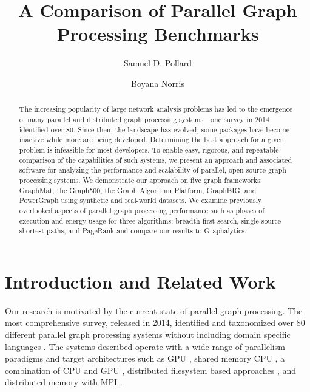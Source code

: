 \documentclass{llncs}
\begin{document}
\title{A Comparison of Parallel Graph Processing Benchmarks}
\author{Samuel D. Pollard \and Boyana Norris}
\maketitle
\begin{abstract}
The increasing popularity of large network analysis problems has led to the emergence of many parallel and distributed graph processing systems---one survey in 2014 identified over 80. Since then, the landscape has evolved; some packages have become inactive while more are being developed. Determining the best approach for a given problem is infeasible for most developers. To enable easy, rigorous, and repeatable comparison of the capabilities of such systems, we present an approach and associated software for analyzing the performance and scalability of parallel, open-source graph processing systems. We demonstrate our approach on five graph frameworks: GraphMat, the Graph500, the Graph Algorithm Platform, GraphBIG, and PowerGraph using synthetic and real-world datasets. We examine previously overlooked aspects of parallel graph processing performance such as phases of execution and energy usage for three algorithms: breadth first search, single source shortest paths, and PageRank and compare our results to Graphalytics.
\end{abstract}

\section{Introduction and Related Work}

Our research is motivated by the current state of parallel graph processing. The most comprehensive survey, released in 2014, identified and taxonomized over 80 different parallel graph processing systems without including domain specific languages \cite{Doekemeijer:2015:GPFSurvey}. The systems described operate with a wide range of parallelism paradigms and target architectures such as GPU \cite{Zhong:2014:Medusa, Kang:2009:Pegasus}, shared memory CPU \cite{Shun:2013:Ligra, kyrola:2012:Graphchi, Nguyen:2013:Galois}, a combination of CPU and GPU \cite{Gharaibeh:2012:Totem}, distributed filesystem based approaches \cite{Xin:2013:GraphX}, and distributed memory with MPI \cite{Gregor:2005:PBGL}.
\end{document}
